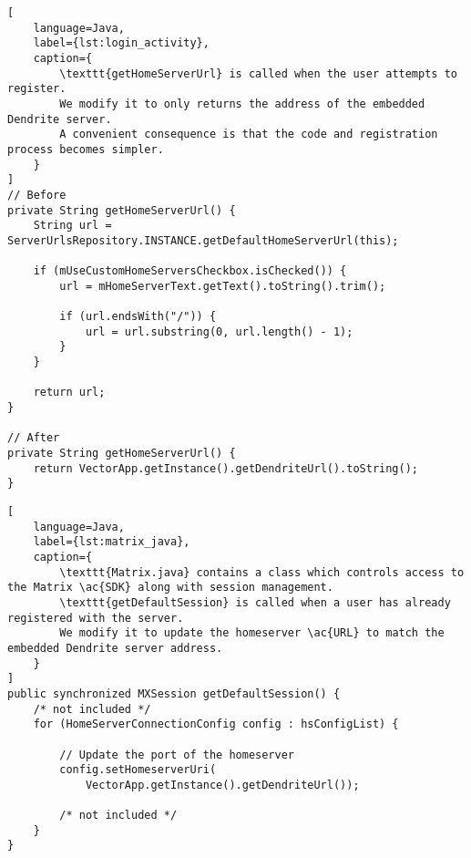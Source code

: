 \begin{lstfloat}
	\begin{lstlisting}[
    language=Java,
    label={lst:login_activity},
    caption={
        \texttt{getHomeServerUrl} is called when the user attempts to register.
        We modify it to only returns the address of the embedded Dendrite server.
        A convenient consequence is that the code and registration process becomes simpler.
    }
]
// Before
private String getHomeServerUrl() {
    String url = ServerUrlsRepository.INSTANCE.getDefaultHomeServerUrl(this);

    if (mUseCustomHomeServersCheckbox.isChecked()) {
        url = mHomeServerText.getText().toString().trim();

        if (url.endsWith("/")) {
            url = url.substring(0, url.length() - 1);
        }
    }

    return url;
}

// After
private String getHomeServerUrl() {
    return VectorApp.getInstance().getDendriteUrl().toString();
}
\end{lstlisting}
\end{lstfloat}

\begin{lstfloat}
	\begin{lstlisting}[
    language=Java,
    label={lst:matrix_java},
    caption={
        \texttt{Matrix.java} contains a class which controls access to the Matrix \ac{SDK} along with session management.
        \texttt{getDefaultSession} is called when a user has already registered with the server.
        We modify it to update the homeserver \ac{URL} to match the embedded Dendrite server address.
    }
]
public synchronized MXSession getDefaultSession() {
    /* not included */
    for (HomeServerConnectionConfig config : hsConfigList) {

        // Update the port of the homeserver
        config.setHomeserverUri(
            VectorApp.getInstance().getDendriteUrl());

        /* not included */
    }
}
\end{lstlisting}
\end{lstfloat}


